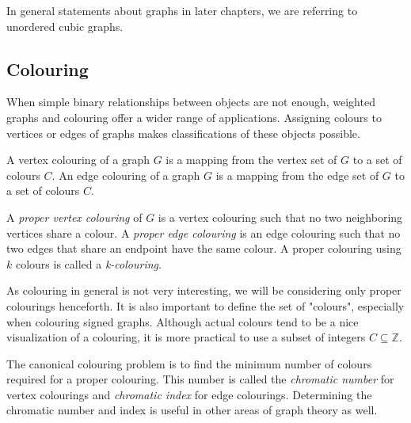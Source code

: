 \begin{figure}[h]
    \centering
\end{figure}

In general statements about graphs in later chapters, we are referring to unordered cubic graphs.

\subsection{Colouring}

When simple binary relationships between objects are not enough, weighted graphs and colouring offer a wider range of applications. Assigning colours to vertices or edges of graphs makes classifications of these objects possible.

\begin{definition}
    A vertex colouring of a graph $G$ is a mapping from the vertex set of $G$ to a set of colours $C$. An edge colouring of a graph $G$ is a mapping from the edge set of $G$ to a set of colours $C$.
\end{definition}

\begin{definition}\label{proper-colouring}
    A \textit{proper vertex colouring} of $G$ is a vertex colouring such that no two neighboring vertices share a colour. A \textit{proper edge colouring} is an edge colouring such that no two edges that share an endpoint have the same colour. A proper colouring using $k$ colours is called a \textit{k-colouring}.
\end{definition}

As colouring in general is not very interesting, we will be considering only proper colourings henceforth. It is also important to define the set of "colours", especially when colouring signed graphs. Although actual colours tend to be a nice visualization of a colouring, it is more practical to use a subset of integers $C \subseteq \mathbb{Z}$.

The canonical colouring problem is to find the minimum number of colours required for a proper colouring. This number is called the \textit{chromatic number} for vertex colourings and \textit{chromatic index} for edge colourings. Determining the chromatic number and index is useful in other areas of graph theory as well.

